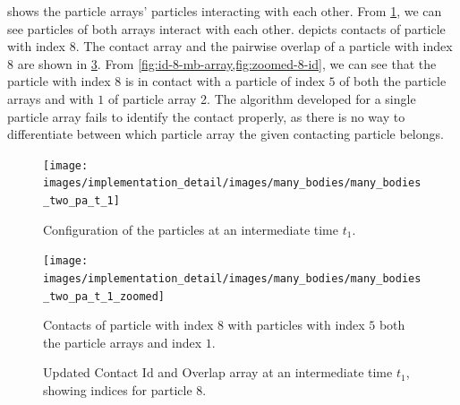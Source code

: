  shows the particle arrays' particles
interacting with each other. From \cref{fig:mb-2-pa-t-2}, we can see particles
of both arrays interact with each other.  depicts
contacts of particle with index $8$. The contact array and the pairwise overlap
of a particle with index $8$ are shown in \cref{fig:id-8-mb-array}. From
\cref{fig:id-8-mb-array,fig:zoomed-8-id}, we can see that the particle with
index $8$ is in contact with a particle of index $5$ of both the particle arrays
and with $1$ of particle array 2. The algorithm developed for a single particle
array fails to identify the contact properly, as there is no way to
differentiate between which particle array the given contacting particle belongs.
\begin{figure}[!htpb]
  \centering
  \texttt{[image: images/implementation\_detail/images/many\_bodies/many\_bodies\_two\_pa\_t\_1]}
  \caption{Configuration of the particles at an intermediate time $t_1$.}
\label{fig:mb-2-pa-t-2}
\end{figure}
\begin{figure}[!htpb]
  \centering
  \texttt{[image: images/implementation\_detail/images/many\_bodies/many\_bodies\_two\_pa\_t\_1\_zoomed]}
  \caption{Contacts of particle with index $8$ with particles with index $5$
    both the particle arrays and index $1$.}
\label{fig:zoomed-8-id}
\end{figure}
\begin{figure}[!htpb]
  \centering
  \caption{Updated Contact Id and Overlap array at an intermediate time $t_1$,
    showing indices for particle $8$.}
\label{fig:id-8-mb-array}
\end{figure}

